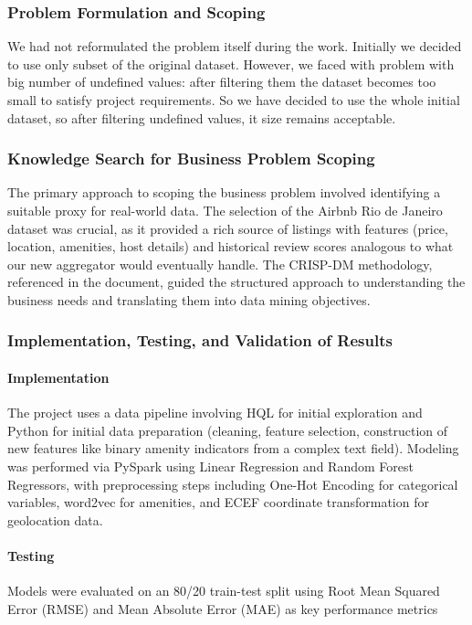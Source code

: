 \subsubsection*{Problem Formulation and Scoping}
We had not reformulated the problem itself during the work. Initially we decided to use only subset of the original dataset.
However, we faced with problem with big number of undefined values: after filtering them the dataset becomes too small to satisfy project requirements. So we have decided to use the whole initial dataset, so after filtering undefined values, it size remains acceptable.


\subsubsection*{Knowledge Search for Business Problem Scoping}
The primary approach to scoping the business problem involved identifying a suitable proxy for real-world data. The selection of the Airbnb Rio de Janeiro dataset was crucial, as it provided a rich source of listings with features (price, location, amenities, host details) and historical review scores analogous to what our new aggregator would eventually handle. The CRISP-DM methodology, referenced in the document, guided the structured approach to understanding the business needs and translating them into data mining objectives.

\subsubsection*{Implementation, Testing, and Validation of Results}

\paragraph{Implementation}
The project uses a data pipeline involving HQL for initial exploration and Python for initial data preparation (cleaning, feature selection, construction of new features like binary amenity indicators from a complex text field). Modeling was performed via PySpark using Linear Regression and Random Forest Regressors, with preprocessing steps including One-Hot Encoding for categorical variables, word2vec for amenities, and ECEF coordinate transformation for geolocation data.

\paragraph{Testing}
Models were evaluated on an 80/20 train-test split using Root Mean Squared Error (RMSE) and Mean Absolute Error (MAE) as key performance metrics

